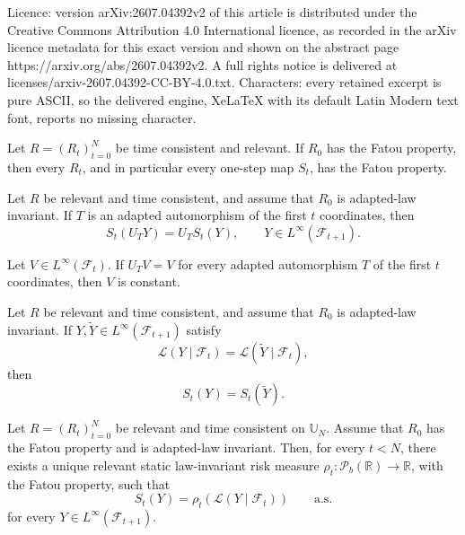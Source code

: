\documentclass[10pt,a4paper]{amsart}
\newcommand{\F}{\mathcal{F}}
\newcommand{\Pc}{\mathcal P}
\newcommand{\R}{\mathbb{R}}
\newcommand{\law}{\mathcal{L}}
\begin{document}
Licence: version arXiv:2607.04392v2 of this article is distributed under the Creative Commons Attribution 4.0 International licence, as recorded in the arXiv licence metadata for this exact version and shown on the abstract page https://arxiv.org/abs/2607.04392v2. A full rights notice is delivered at licenses/arxiv-2607.04392-CC-BY-4.0.txt. Characters: every retained excerpt is pure ASCII, so the delivered engine, XeLaTeX with its default Latin Modern text font, reports no missing character.
\begin{lemma}
\label{lem:R0-fatou-implies-one-step-fatou}
Let \(R=(R_t)_{t=0}^N\) be time consistent and relevant. If \(R_0\) has the
Fatou property, then every \(R_t\), and in particular every one-step map
\(S_t\), has the Fatou property.
\end{lemma}

\begin{lemma}
\label{lem:adapted-automorphism-equivariance}
Let \(R\) be relevant and time consistent, and assume that \(R_0\) is
adapted-law invariant. If \(T\) is an adapted automorphism of the first
\(t\) coordinates, then
\[
S_t(U_TY)=U_TS_t(Y),
\qquad Y\in L^\infty(\F_{t+1}).
\]
\end{lemma}

\begin{lemma}
\label{lem:adapted-automorphism-ergodicity}
Let \(V\in L^\infty(\F_t)\). If \(U_TV=V\) for every adapted automorphism
\(T\) of the first \(t\) coordinates, then \(V\) is constant.
\end{lemma}

\begin{lemma}
\label{lem:current-kernel-invariance}
Let \(R\) be relevant and time consistent, and assume that \(R_0\) is
adapted-law invariant. If \(Y,\widetilde Y\in L^\infty(\F_{t+1})\) satisfy
\[
\law(Y\mid\F_t)=\law(\widetilde Y\mid\F_t),
\]
then
\[
S_t(Y)=S_t(\widetilde Y).
\]
\end{lemma}

\begin{lemma}
\label{lem:one-step-from-R0}
Let \(R=(R_t)_{t=0}^N\) be relevant and time consistent on \(\mathbb U_N\).
Assume that \(R_0\) has the Fatou property and is adapted-law invariant. Then,
for every \(t<N\), there exists a unique relevant static law-invariant risk
measure \(\rho_t:\Pc_b(\R)\to\R\), with the Fatou property, such that
\[
S_t(Y)=\rho_t(\law(Y\mid\F_t))
\qquad\text{a.s.}
\]
for every \(Y\in L^\infty(\F_{t+1})\).
\end{lemma}
\end{document}
